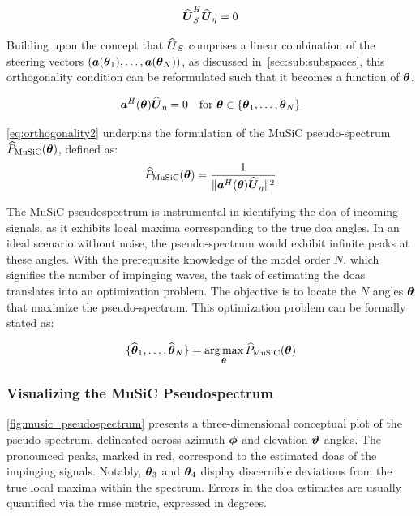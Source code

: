 \begin{equation}
    \widehat{\boldsymbol{U}}_S^H \widehat{\boldsymbol{U}}_\eta = 0
    \label{eq:orthogonality}
\end{equation}

Building upon the concept that \( \widehat{\boldsymbol{U}}_S \) comprises a linear combination of the steering vectors \( (\boldsymbol{a}(\boldsymbol{\theta}_1), \ldots, \boldsymbol{a}(\boldsymbol{\theta}_N)) \),
as discussed in~\autoref{sec:sub:subspaces}, this orthogonality condition can be reformulated such that it becomes a
function of \( \boldsymbol{\theta} \).

\begin{equation}
    \boldsymbol{a}^H(\boldsymbol{\theta}) \widehat{\boldsymbol{U}}_\eta = 0 \quad \text{for } \boldsymbol{\theta} \in \{\boldsymbol{\theta}_1, \ldots, \boldsymbol{\theta}_N\}
    \label{eq:orthogonality2}
\end{equation}

\autoref{eq:orthogonality2} underpins the formulation of the MuSiC pseudo-spectrum \( \widehat{P}_{\text{MuSiC}}(\boldsymbol{\theta}) \), defined as:
\begin{equation}
    \widehat{P}_{\text{MuSiC}}(\boldsymbol{\theta}) = \frac{1}{\|\boldsymbol{a}^H(\boldsymbol{\theta}) \widehat{\boldsymbol{U}}_\eta \|^2}
\end{equation}

The MuSiC pseudospectrum is instrumental in identifying the \gls{doa} of incoming signals, as it exhibits local maxima
corresponding to the true \gls{doa} angles. In an ideal scenario without noise, the pseudo-spectrum would exhibit
infinite peaks at these angles. With the prerequisite knowledge of the model order \( N \), which signifies the number
of impinging waves, the task of estimating the \glspl{doa} translates into an optimization problem. The objective is to
locate the \( N \) angles \( \boldsymbol{\theta} \) that maximize the pseudo-spectrum. This optimization problem can be formally stated as:

\begin{equation}
    \{\widehat{\boldsymbol{\theta}}_1, \ldots, \widehat{\boldsymbol{\theta}}_N\} = \operatorname*{arg\,max}_{\boldsymbol{\theta}} \widehat{P}_{\text{MuSiC}}(\boldsymbol{\theta})
\end{equation}

\subsubsection*{Visualizing the MuSiC Pseudospectrum}
\autoref{fig:music_pseudospectrum} presents a three-dimensional conceptual plot of the pseudo-spectrum, delineated across
azimuth \( \boldsymbol{\phi} \) and elevation \( \boldsymbol{\vartheta} \) angles. The pronounced peaks, marked in red, correspond to the estimated
\glspl{doa} of the impinging signals. Notably, \( \boldsymbol{\theta}_3 \) and \( \boldsymbol{\theta}_4 \) display discernible deviations from the true
local maxima within the spectrum. Errors in the \gls{doa} estimates are usually quantified via the \gls{rmse} metric,
expressed in degrees.

